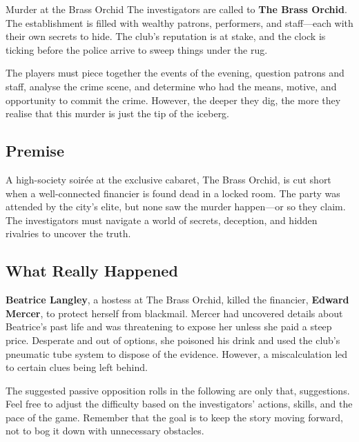 
\begin{WyrdScenarioHeading}{Murder at the Brass Orchid}
	The investigators are called to \textbf{The Brass Orchid}. The establishment is filled with wealthy patrons, performers, and staff—each with their own secrets to hide. The club’s reputation is at stake, and the clock is ticking before the police arrive to sweep things under the rug.

	The players must piece together the events of the evening, question patrons and staff, analyse the crime scene, and determine who had the means, motive, and opportunity to commit the crime. However, the deeper they dig, the more they realise that this murder is just the tip of the iceberg.

	\subsection*{Premise} 
	A high-society soirée at the exclusive cabaret, The Brass Orchid, is cut short when a well-connected financier is found dead in a locked room. The party was attended by the city's elite, but none saw the murder happen—or so they claim. The investigators must navigate a world of secrets, deception, and hidden rivalries to uncover the truth.

	\subsection*{What Really Happened} 
	\textbf{Beatrice Langley}, a hostess at The Brass Orchid, killed the financier, \textbf{Edward Mercer}, to protect herself from blackmail. Mercer had uncovered details about Beatrice’s past life and was threatening to expose her unless she paid a steep price. Desperate and out of options, she poisoned his drink and used the club’s pneumatic tube system to dispose of the evidence. However, a miscalculation led to certain clues being left behind.
\end{WyrdScenarioHeading}

\begin{WyrdGmTips}
	The suggested passive opposition rolls in the following are only that, suggestions. Feel free to adjust the difficulty based on the investigators' actions, skills, and the pace of the game. Remember that the goal is to keep the story moving forward, not to bog it down with unnecessary obstacles.
\end{WyrdGmTips}





